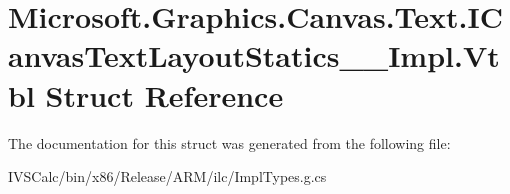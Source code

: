 \hypertarget{struct_microsoft_1_1_graphics_1_1_canvas_1_1_text_1_1_i_canvas_text_layout_statics_____impl_1_1_vtbl}{}\section{Microsoft.\+Graphics.\+Canvas.\+Text.\+I\+Canvas\+Text\+Layout\+Statics\+\_\+\+\_\+\+Impl.\+Vtbl Struct Reference}
\label{struct_microsoft_1_1_graphics_1_1_canvas_1_1_text_1_1_i_canvas_text_layout_statics_____impl_1_1_vtbl}


The documentation for this struct was generated from the following file\+:\begin{DoxyCompactItemize}
\item 
I\+V\+S\+Calc/bin/x86/\+Release/\+A\+R\+M/ilc/Impl\+Types.\+g.\+cs\end{DoxyCompactItemize}
